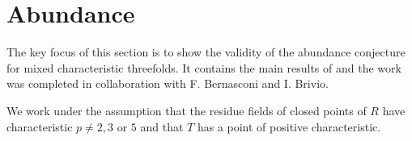 %
%
%
%
%
%
%
%
%
%
%
%

	\chapter{Abundance}\label{abundance-sect}
	
	The key focus of this section is to show the validity of the abundance conjecture for mixed characteristic threefolds. It contains the main results of \cite{bernasconi2021abundance} and the work was completed in collaboration with F. Bernasconi and I. Brivio. 
	
	We work under the assumption that the residue fields of closed points of $R$ have characteristic $p\neq 2,3$ or $5$ and that $T$ has a point of positive characteristic. 
	
